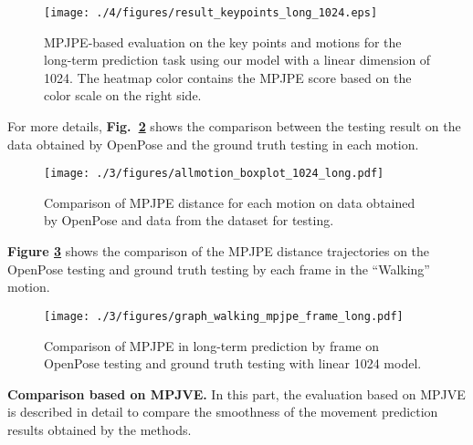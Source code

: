 \begin{figure}
    \centering
    \texttt{[image: ./4/figures/result\_keypoints\_long\_1024.eps]}
    \caption{
        MPJPE-based evaluation on the key points and motions for the long-term prediction task using our model with a linear dimension of 1024. The heatmap color contains the MPJPE score based on the color scale on the right side.
    }
    \label{fig:2D_mpjpe_keypoints}
\end{figure}

For more details, \textbf{Fig.~\ref{fig:2D_openposegt_motions}} shows the comparison between the testing result on the data obtained by OpenPose and the ground truth testing in each motion.
\begin{figure}
    \centering
    \texttt{[image: ./3/figures/allmotion\_boxplot\_1024\_long.pdf]}
    \caption{
        Comparison of MPJPE distance for each motion on data obtained by OpenPose and data from the dataset for testing.
    }
    \label{fig:2D_openposegt_motions}
\end{figure}

\textbf{Figure \ref{fig:2D_mpjpe_frame}} shows the comparison of the MPJPE distance trajectories on the OpenPose testing and ground truth testing by each frame in the ``Walking'' motion.
\begin{figure}[tb]
    \centering
    \texttt{[image: ./3/figures/graph\_walking\_mpjpe\_frame\_long.pdf]}
    \caption{
        Comparison of MPJPE in long-term prediction by frame on OpenPose testing and ground truth testing with linear 1024 model.
    }
    \label{fig:2D_mpjpe_frame}
\end{figure}


\textbf{Comparison based on MPJVE.} In this part, the evaluation based on MPJVE is described in detail to compare the smoothness of the movement prediction results obtained by the methods.

